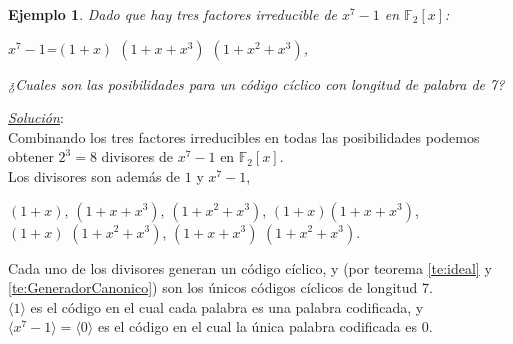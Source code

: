 \documentclass{beamer}
\theoremstyle{plain}
\theoremstyle{example}
\theoremstyle{example}
\newtheorem{ejemplo} [Ejemplo] {Ejemplo}
\begin{document}
\begin{frame}  \small  
\begin{ejemplo}

Dado que hay tres factores irreducible de $x^7-1$ en $\mathbb{F}_2[x]$:

\begin{center}
$x^7 -1$=$(1+x)$ $(1+x+x^3)$ $(1+x^2 +x^3)$,
\end{center}

¿Cuales son las posibilidades para un código cíclico con longitud de palabra de 7?\\
\end{ejemplo}


\textit{\underline{Solución}}:\\
\vspace*{5pt}
Combinando los tres factores irreducibles en todas las posibilidades podemos obtener $2^3=8$ divisores de $x^7-1$ en $\mathbb{F}_2[x]$.\\
\vspace*{5pt}
Los divisores son además de $1$ y $x^7 - 1$,

\begin{center}
$(1+x)$,	$(1+x+x^3)$,	$(1+x^2 +x^3)$,	$(1+x)(1+x+x^3)$,\\
$(1+x)$ $(1+x^2 +x^3)$,	 $(1+x+x^3)$ $(1+x^2 +x^3)$.

\end{center}

Cada uno de los divisores generan un código cíclico, y  (por teorema \ref{te:ideal} y \ref{te:GeneradorCanonico}) son los únicos códigos cíclicos de longitud 7. \\
\vspace*{5pt}
$\langle 1\rangle$ es el código en el cual cada palabra es una palabra codificada, y $\langle x^7 -1\rangle = \langle 0 \rangle$ es el código en el cual la única palabra codificada es 0. \\
\vspace*{5pt}
\end{frame} 
\end{document}
